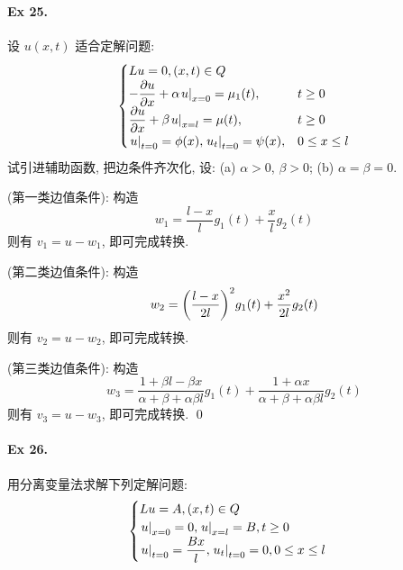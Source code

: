 \paragraph{Ex 25.}
设 $u(x, t)$ 适合定解问题:
\[ \begin{cases}
Lu = 0, (x, t) \in Q \\
-\dfrac{\partial u}{\partial x} + \alpha {\left.{u} \right|}_{x=0} = \mu_1(t), & t \geq 0 \\
\dfrac{\partial u}{\partial x} + \beta {\left.{u} \right|}_{x=l} = \mu(t), & t \geq 0 \\
{\left.{u} \right|}_{t=0} = \phi(x), {\left.{u_t} \right|}_{t=0} = \psi(x), & 0 \leq x \leq l
\end{cases} \]
试引进辅助函数, 把边条件齐次化, 设: (a) $\alpha > 0$, $\beta > 0$; (b)
$\alpha = \beta = 0$.

\solution
\noindent (第一类边值条件): 构造
\[w_1 = \frac{l-x}{l}g_1(t) + \frac xl g_2(t)\]
则有 $v_1 = u - w_1$, 即可完成转换.

\noindent (第二类边值条件): 构造
\[w_2 = {\left( {\frac{l-x}{2l}} \right)}^2 g_1(t) + \frac{x^2}{2l} g_2(t)\]
则有 $v_2 = u - w_2$, 即可完成转换.

\noindent (第三类边值条件): 构造
\[
w_3 = \frac{1 + \beta l- \beta x}{\alpha + \beta + \alpha\beta l} g_1(t)
+ \frac{1 + \alpha x}{\alpha + \beta + \alpha\beta l} g_2(t)
\]
则有 $v_3 = u - w_3$, 即可完成转换.
\qed

\paragraph{Ex 26.}
用分离变量法求解下列定解问题:
\[ \begin{cases}
Lu = A, (x, t) \in Q \\
{\left.{u} \right|}_{x=0} = 0, {\left.{u} \right|}_{x=l} = B, t \geq 0 \\
{\left.{u} \right|}_{t=0} = \dfrac{Bx}{l}, {\left.{u_t} \right|}_{t=0} = 0, 0 \leq x \leq l
\end{cases} \]

